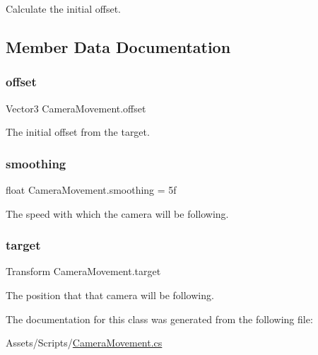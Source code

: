 Calculate the initial offset. 



\subsection{Member Data Documentation}
\mbox{\label{class_camera_movement_a76c04e8960b9aa6db0ac10da72a3ef14}} 
\subsubsection{\texorpdfstring{offset}{offset}}
{\footnotesize\ttfamily Vector3 Camera\+Movement.\+offset\hspace{0.3cm}{\ttfamily [private]}}

The initial offset from the target. \mbox{\label{class_camera_movement_ac54d2d4baa94f39db3c41ac60ddb57a3}} 
\subsubsection{\texorpdfstring{smoothing}{smoothing}}
{\footnotesize\ttfamily float Camera\+Movement.\+smoothing = 5f}

The speed with which the camera will be following. \mbox{\label{class_camera_movement_a260db5e549bc85e522e0c165e425fac6}} 
\subsubsection{\texorpdfstring{target}{target}}
{\footnotesize\ttfamily Transform Camera\+Movement.\+target}

The position that that camera will be following. 

The documentation for this class was generated from the following file\+:\begin{DoxyCompactItemize}
\item 
Assets/\+Scripts/\mbox{\hyperlink{_camera_movement_8cs}{Camera\+Movement.\+cs}}\end{DoxyCompactItemize}
